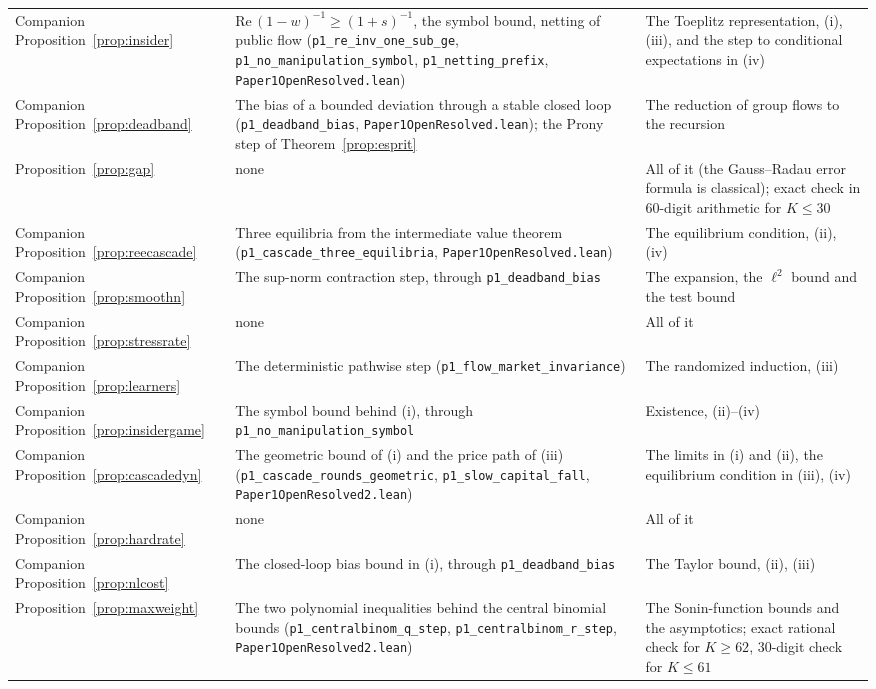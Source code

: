 \documentclass[12pt]{article}
\theoremstyle{definition}
\theoremstyle{remark}
\begin{document}
\begin{longtable}{>{\raggedright\arraybackslash}p{}>{\raggedright\arraybackslash}p{}>{\raggedright\arraybackslash}p{}}
Companion Proposition~\ref{prop:insider} & $\mathrm{Re}\,(1-w)^{-1}\ge(1+s)^{-1}$, the symbol bound, netting of public flow (\texttt{p1\_re\_inv\_one\_sub\_ge}, \texttt{p1\_no\_manipulation\_symbol}, \texttt{p1\_netting\_prefix}, \nolinkurl{Paper1OpenResolved.lean}) & The Toeplitz representation, (i), (iii), and the step to conditional expectations in (iv)\\
Companion Proposition~\ref{prop:deadband} & The bias of a bounded deviation through a stable closed loop (\texttt{p1\_deadband\_bias}, \nolinkurl{Paper1OpenResolved.lean}); the Prony step of Theorem~\ref{prop:esprit} & The reduction of group flows to the recursion\\
Proposition~\ref{prop:gap} & none & All of it (the Gauss--Radau error formula is classical); exact check in 60-digit arithmetic for $K\le30$\\
Companion Proposition~\ref{prop:reecascade} & Three equilibria from the intermediate value theorem (\texttt{p1\_cascade\_three\_equilibria}, \nolinkurl{Paper1OpenResolved.lean}) & The equilibrium condition, (ii), (iv)\\
Companion Proposition~\ref{prop:smoothn} & The sup-norm contraction step, through \texttt{p1\_deadband\_bias} & The expansion, the $\ell^2$ bound and the test bound\\
Companion Proposition~\ref{prop:stressrate} & none & All of it\\
Companion Proposition~\ref{prop:learners} & The deterministic pathwise step (\texttt{p1\_flow\_market\_invariance}) & The randomized induction, (iii)\\
Companion Proposition~\ref{prop:insidergame} & The symbol bound behind (i), through \texttt{p1\_no\_manipulation\_symbol} & Existence, (ii)--(iv)\\
Companion Proposition~\ref{prop:cascadedyn} & The geometric bound of (i) and the price path of (iii) (\texttt{p1\_cascade\_rounds\_geometric}, \texttt{p1\_slow\_capital\_fall}, \nolinkurl{Paper1OpenResolved2.lean}) & The limits in (i) and (ii), the equilibrium condition in (iii), (iv)\\
Companion Proposition~\ref{prop:hardrate} & none & All of it\\
Companion Proposition~\ref{prop:nlcost} & The closed-loop bias bound in (i), through \texttt{p1\_deadband\_bias} & The Taylor bound, (ii), (iii)\\
Proposition~\ref{prop:maxweight} & The two polynomial inequalities behind the central binomial bounds (\texttt{p1\_centralbinom\_q\_step}, \texttt{p1\_centralbinom\_r\_step}, \nolinkurl{Paper1OpenResolved2.lean}) & The Sonin-function bounds and the asymptotics; exact rational check for $K\ge62$, 30-digit check for $K\le61$\\

\end{longtable}
\end{document}
